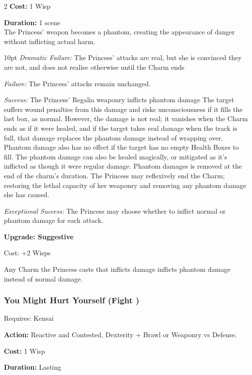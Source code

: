 \begin{multicols}{2}
\noindent \textbf{Cost:} 1 Wisp

\noindent \textbf{Duration:} 1 scene \\

\noindent The Princess' weapon becomes a phantom, creating the appearance of danger without inflicting actual harm.

\begin{myindentpar}{10pt} 
\emph{Dramatic Failure:} The Princess' attacks are real, but she is convinced they are not, and does not realise otherwise until the Charm ends

\emph{Failure:} The Princess' attacks remain unchanged.

\emph{Success:} The Princess' Regalia weaponry inflicts phantom damage The target suffers wound penalties from this damage and risks unconsciousness if it fills the last box, as normal. However, the damage is not real; it vanishes when the Charm ends as if it were healed, and if the target takes real damage when the track is full, that damage replaces the phantom damage instead of wrapping over. Phantom damage also has no effect if the target has no empty Health Boxes to fill. The phantom damage can also be healed magically, or mitigated as it's inflicted as though it were regular damage. Phantom damages is removed at the end of the charm's duration. The Princess may reflexively end the Charm; restoring the lethal capacity of her weaponry and removing any phantom damage she has caused. 

\emph{Exceptional Success:} The Princess may choose whether to inflict normal or phantom damage for each attack.

\textbf{Upgrade: Suggestive}

Cost: +2 Wisps

Any Charm the Princess casts that inflicts damage inflicts phantom damage instead of normal damage. 

\end{myindentpar}
\subsubsection*{You Might Hurt Yourself (Fight \textbullet\textbullet)}

\noindent Requires: Kensai 

\noindent \textbf{Action:} Reactive and Contested, Dexterity + Brawl or Weaponry vs Defense.

\noindent \textbf{Cost:} 1 Wisp

\noindent \textbf{Duration:} Lasting \\


\end{multicols}

